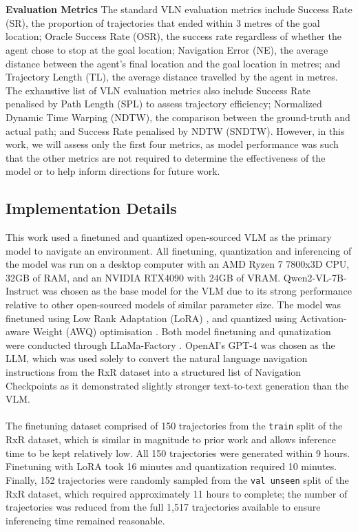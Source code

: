 \documentclass{svproc}
\begin{document}
    \\ \\
    \textbf{Evaluation Metrics}  The standard VLN evaluation metrics \cite{mattersim} include Success Rate (SR), the proportion of trajectories that ended within 3 metres of the goal location; Oracle Success Rate (OSR), the success rate regardless of whether the agent chose to stop at the goal location; Navigation Error (NE), the average distance between the agent's final location and the goal location in metres; and Trajectory Length (TL), the average distance travelled by the agent in metres. The exhaustive list of VLN evaluation metrics also include Success Rate penalised by Path Length (SPL) to assess trajectory efficiency; Normalized Dynamic Time Warping (NDTW), the comparison between the ground-truth and actual path; and Success Rate penalised by NDTW (SNDTW). However, in this work, we will assess only the first four metrics, as model performance was such that the other metrics are not required to determine the effectiveness of the model or to help inform directions for future work.
    
\subsection{Implementation Details}
    This work used a finetuned and quantized open-sourced VLM as the primary model to navigate an environment. All finetuning, quantization and inferencing of the model was run on a desktop computer with an AMD Ryzen 7 7800x3D CPU, 32GB of RAM, and an NVIDIA RTX4090 with 24GB of VRAM. Qwen2-VL-7B-Instruct \cite{Qwen-VL, Qwen2VL} was chosen as the base model for the VLM due to its strong performance relative to other open-sourced models \cite{vlm_leaderboard, Nguyen-Mau_2024_ACCV} of similar parameter size. The model was finetuned using Low Rank Adaptation (LoRA) \cite{LoRA}, and quantized using Activation-aware Weight (AWQ) optimisation \cite{MLSYS2024_42a452cb}. Both model finetuning and qunatization were conducted through LLaMa-Factory \cite{zheng2024llamafactory}. OpenAI's GPT-4 \cite{openai2024gpt4technicalreport} was chosen as the LLM, which was used solely to convert the natural language navigation instructions from the RxR dataset into a structured list of Navigation Checkpoints as it demonstrated slightly stronger text-to-text generation than the VLM.
    \\ \\
    The finetuning dataset comprised of 150 trajectories from the \texttt{train} split of the RxR dataset, which is similar in magnitude to prior work \cite{open-nav} and allows inference time to be kept relatively low. All 150 trajectories were generated within 9 hours. Finetuning with LoRA took 16 minutes and quantization required 10 minutes. Finally, 152 trajectories were randomly sampled from the \texttt{val unseen} split of the RxR dataset, which required approximately 11 hours to complete; the number of trajectories was reduced from the full 1,517 trajectories available to ensure inferencing time remained reasonable.
\end{document}
